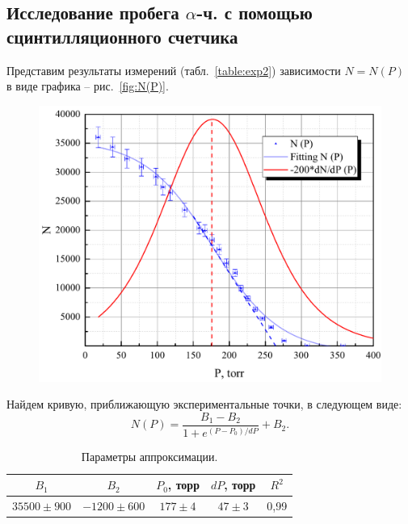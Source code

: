 \documentclass[a4paper,12pt]{article} %
\begin{document}
	
		\newpage
		\subsection{Исследование пробега $\alpha$-ч. с помощью сцинтилляционного счетчика}	
		Представим результаты измерений (табл.~\ref{table:exp2}) зависимости $N=N(P)$ в виде графика -- рис.~\ref{fig:N(P)}. 
		
		\begin{figure}[h!]
			\begin{floatrow}
				{\includegraphics[scale=0.5]{graph2.pdf}}    
			\end{floatrow}
		\end{figure}
		
		Найдем кривую, приближающую экспериментальные точки, в следующем виде:
		\begin{equation*}
			N (P) = \frac{B_1-B_2}{1+e^{(P-P_0)/dP}} + B_2.
		\end{equation*}
		
		\begin{table}[H]
			\caption{Параметры аппроксимации.}
			\label{tab:parametry2}
			\begin{tabular}{|c|c|c|c|c|}
				\hline
				$B_1$ & $B_2$ & $P_0$, торр & $dP$, торр & $R^2$ \\ \hline
				$35500 \pm 900$  & $-1200 \pm 600$    & $177\pm 4$        & $47\pm 3$      & 0,99     \\ \hline
			\end{tabular}
		\end{table}
		
\end{document}
